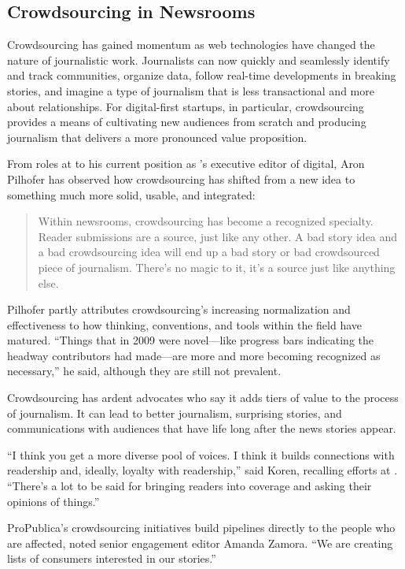 \begin{itemize}
\begin{itemize}
\chapter{Crowdsourcing in Newsrooms}	

Crowdsourcing has gained momentum as web technologies have changed the nature of journalistic work. Journalists can now quickly and seamlessly identify and track communities, organize data, follow real-time developments in breaking stories, and imagine a type of journalism that is less transactional and more about relationships. For digital-first startups, in particular, crowdsourcing provides a means of cultivating new audiences from scratch and producing journalism that delivers a more pronounced value proposition. 

From roles at  to his current position as ’s executive editor of digital, Aron Pilhofer has observed how crowdsourcing has shifted from a new idea to something much more solid, usable, and integrated: 
\begin{quote}
Within newsrooms, crowdsourcing has become a recognized specialty. Reader submissions are a source, just like any other. A bad story idea and a bad crowdsourcing idea will end up a bad story or bad crowdsourced piece of journalism. There’s no magic to it, it’s a source just like anything else.\autocite{Pilhofer}
\end{quote}

Pilhofer partly attributes crowdsourcing’s increasing normalization and effectiveness to how thinking, conventions, and tools within the field have matured. ``Things that in 2009 were novel---like progress bars indicating the headway contributors had made---are more and more becoming recognized as necessary,'' he said, although they are still not prevalent.

Crowdsourcing has ardent advocates who say it adds tiers of value to the process of journalism. It can lead to better journalism, surprising stories, and communications with audiences that have life long after the news stories appear.

``I think you get a more diverse pool of voices. I think it builds connections with readership and, ideally, loyalty with readership,'' said Koren, recalling efforts at . ``There’s a lot to be said for bringing readers into coverage and asking their opinions of things.''\autocite{Koren}

ProPublica’s crowdsourcing initiatives build pipelines directly to the people who are affected, noted senior engagement editor Amanda Zamora. ``We are creating lists of consumers interested in our stories.''\autocite{Zamora}


\end{itemize}
\end{itemize}
